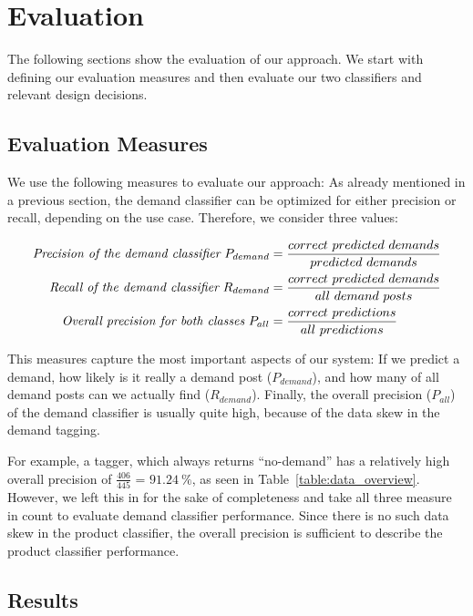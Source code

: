 
\section{Evaluation}
\label{sec:evaluation}

The following sections show the evaluation of our approach.
We start with defining our evaluation measures and then evaluate our two classifiers and relevant design decisions.

\subsection{Evaluation Measures}
\label{sub:evaluation_measures}
We use the following measures to evaluate our approach:
As already mentioned in a previous section, the demand classifier can be optimized for either precision or recall, depending on the use case.
Therefore, we consider three values:

\begin{align*}
	\emph{Precision of the demand classifier}~P_{demand} 			&= \frac{correct~predicted~demands}{predicted~demands} \\
	\emph{Recall of the demand classifier}~R_{demand} 				&= \frac{correct~predicted~demands}{all~demand~posts} \\
	\emph{Overall precision for both classes}~P_{all} &= \frac{correct~predictions}{all~predictions} \\
\end{align*}

This measures capture the most important aspects of our system: If we predict a demand, how likely is it really a demand post ($P_{demand}$), and how many of all demand posts can we actually find ($R_{demand}$).
Finally, the overall precision ($P_{all}$) of the demand classifier is usually quite high, because of the data skew in the demand tagging.

For example, a tagger, which always returns ``no-demand'' has a relatively high overall precision of $\frac{406}{445}$ = $91.24~\%$, as seen in Table~\ref{table:data_overview}.
However, we left this in for the sake of completeness and take all three measure in count to evaluate demand classifier performance.
Since there is no such data skew in the product classifier, the overall precision is sufficient to describe the product classifier performance.

\subsection{Results}
\label{sub:results}

